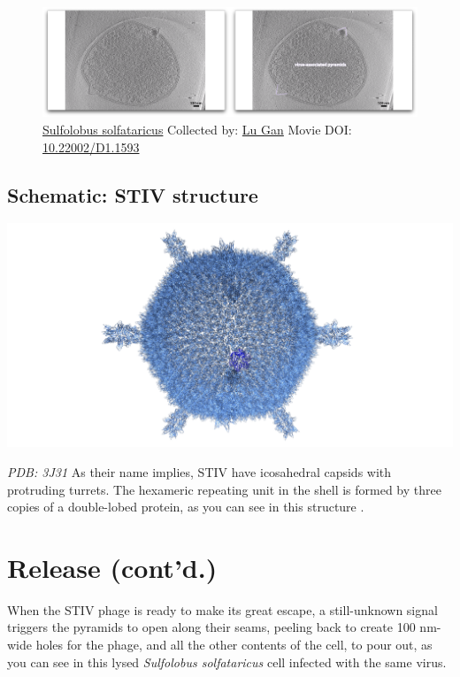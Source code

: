 \documentclass[]{tufte-book}
\begin{document}
\begin{figure}
\includegraphics{movie_stills/10_8} \caption[\protect\hyperlink{tree}{Sulfolobus solfataricus} Collected
by: \protect\hyperlink{lu_gan}{Lu Gan} Movie DOI:
\href{https://doi.org/10.22002/D1.1593}{10.22002/D1.1593}]{\protect\hyperlink{tree}{Sulfolobus solfataricus} Collected
by: \protect\hyperlink{lu_gan}{Lu Gan} Movie DOI:
\href{https://doi.org/10.22002/D1.1593}{10.22002/D1.1593}}\label{fig:10-8}
\end{figure}

\hypertarget{STIV_structure}{\subsection*{Schematic: STIV
structure}\label{STIV_structure}}

\includegraphics{img/schematics/10_8_1}

\emph{PDB: 3J31} As their name implies, STIV have icosahedral capsids
with protruding turrets. The hexameric repeating unit in the shell is
formed by three copies of a double-lobed protein, as you can see in this
structure \citep{veesler2013}.

\section{Release (cont'd.)}\label{release-contd.}

When the STIV phage is ready to make its great escape, a still-unknown
signal triggers the pyramids to open along their seams, peeling back to
create 100 nm-wide holes for the phage, and all the other contents of
the cell, to pour out, as you can see in this lysed \emph{Sulfolobus
solfataricus} cell infected with the same virus.
\end{document}
